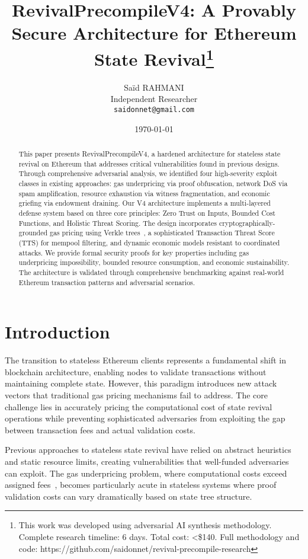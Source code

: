 \documentclass{article}
\title{RevivalPrecompileV4: A Provably Secure Architecture for Ethereum State Revival\thanks{This work was developed using adversarial AI synthesis methodology. Complete research timeline: 6 days. Total cost: <\$140. Full methodology and code: https://github.com/saidonnet/revival-precompile-research}}
\author{
  Saïd RAHMANI \\
  Independent Researcher \\
  \texttt{saidonnet@gmail.com}
}
\date{\today}
\begin{document}
\maketitle

\begin{abstract}
This paper presents RevivalPrecompileV4, a hardened architecture for stateless state revival on Ethereum that addresses critical vulnerabilities found in previous designs. Through comprehensive adversarial analysis, we identified four high-severity exploit classes in existing approaches: gas underpricing via proof obfuscation, network DoS via spam amplification, resource exhaustion via witness fragmentation, and economic griefing via endowment draining. Our V4 architecture implements a multi-layered defense system based on three core principles: Zero Trust on Inputs, Bounded Cost Functions, and Holistic Threat Scoring. The design incorporates cryptographically-grounded gas pricing using Verkle trees~\cite{kuszmaul2018verkle}, a sophisticated Transaction Threat Score (TTS) for mempool filtering, and dynamic economic models resistant to coordinated attacks. We provide formal security proofs for key properties including gas underpricing impossibility, bounded resource consumption, and economic sustainability. The architecture is validated through comprehensive benchmarking against real-world Ethereum transaction patterns and adversarial scenarios.
\end{abstract}

\section{Introduction}

The transition to stateless Ethereum clients represents a fundamental shift in blockchain architecture, enabling nodes to validate transactions without maintaining complete state. However, this paradigm introduces new attack vectors that traditional gas pricing mechanisms fail to address. The core challenge lies in accurately pricing the computational cost of state revival operations while preventing sophisticated adversaries from exploiting the gap between transaction fees and actual validation costs.

Previous approaches to stateless state revival have relied on abstract heuristics and static resource limits, creating vulnerabilities that well-funded adversaries can exploit. The gas underpricing problem, where computational costs exceed assigned fees~\cite{chen2017adaptive}, becomes particularly acute in stateless systems where proof validation costs can vary dramatically based on state tree structure.
\end{document}
